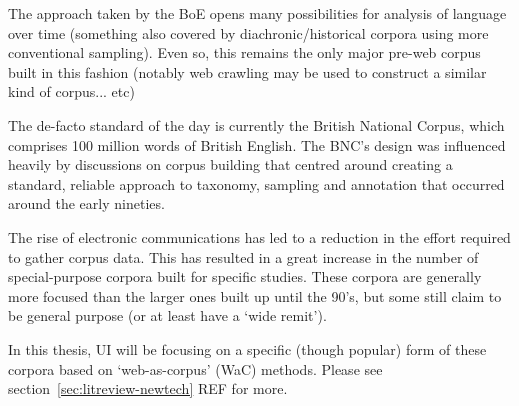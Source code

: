 The approach taken by the BoE opens many possibilities for analysis of language over time (something also covered by diachronic/historical corpora using more conventional sampling).  Even so, this remains the only major pre-web corpus built in this fashion (notably web crawling may be used to construct a similar kind of corpus... etc)

The de-facto standard of the day is currently the British National Corpus, which comprises 100 million words of British English.  The BNC's design was influenced heavily by discussions on corpus building that centred around creating a standard, reliable approach to taxonomy, sampling and annotation that occurred around the early nineties.


% 


The rise of electronic communications has led to a reduction in the effort required to gather corpus data.  This has resulted in a great increase in the number of special-purpose corpora built for specific studies.  These corpora are generally more focused than the larger ones built up until the 90's, but some still claim to be general purpose (or at least have a `wide remit').  


In this thesis, UI will be focusing on a specific (though popular) form of these corpora based on `web-as-corpus' (WaC) methods.  Please see section~\ref{sec:litreview-newtech} REF for more.






















